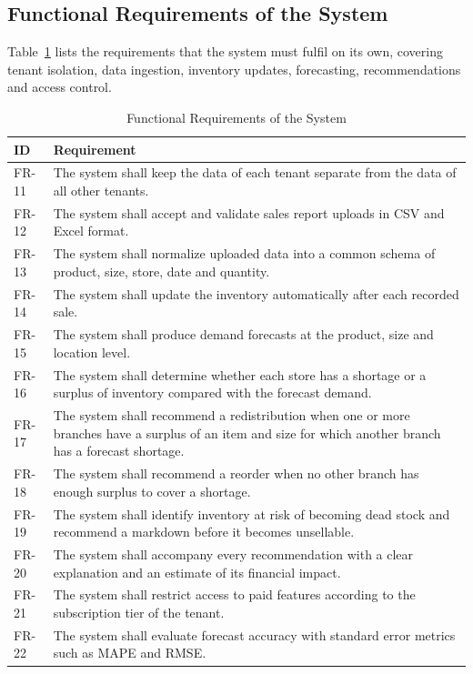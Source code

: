 \documentclass{StockSense}
\begin{document}
\subsection{Functional Requirements of the System}

Table~\ref{tab:fr-system} lists the requirements that the system must fulfil on its own, covering tenant isolation, data ingestion, inventory updates, forecasting, recommendations and access control.

\begin{table}[htbp]
\centering
\caption{Functional Requirements of the System}
\label{tab:fr-system}
\begin{tabular}{|l|p{12cm}|}
\hline
\textbf{ID} & \textbf{Requirement} \\ \hline
FR-11 & The system shall keep the data of each tenant separate from the data of all other tenants. \\ \hline
FR-12 & The system shall accept and validate sales report uploads in CSV and Excel format. \\ \hline
FR-13 & The system shall normalize uploaded data into a common schema of product, size, store, date and quantity. \\ \hline
FR-14 & The system shall update the inventory automatically after each recorded sale. \\ \hline
FR-15 & The system shall produce demand forecasts at the product, size and location level. \\ \hline
FR-16 & The system shall determine whether each store has a shortage or a surplus of inventory compared with the forecast demand. \\ \hline
FR-17 & The system shall recommend a redistribution when one or more branches have a surplus of an item and size for which another branch has a forecast shortage. \\ \hline
FR-18 & The system shall recommend a reorder when no other branch has enough surplus to cover a shortage. \\ \hline
FR-19 & The system shall identify inventory at risk of becoming dead stock and recommend a markdown before it becomes unsellable. \\ \hline
FR-20 & The system shall accompany every recommendation with a clear explanation and an estimate of its financial impact. \\ \hline
FR-21 & The system shall restrict access to paid features according to the subscription tier of the tenant. \\ \hline
FR-22 & The system shall evaluate forecast accuracy with standard error metrics such as MAPE and RMSE. \\ \hline
\end{tabular}
\end{table}
\end{document}
